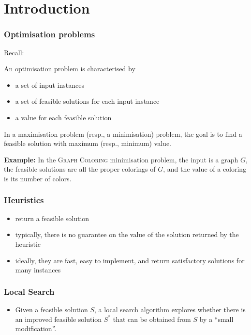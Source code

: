 



\section{Introduction}

\begin{frame}
	\frametitle{Optimisation problems}

  Recall:
  	\begin{definition}
  		An \alert{optimisation problem} is characterised by
  		\begin{itemize}
  			\item a set of input instances
  			\item a set of \alert{feasible solutions} for each input instance
  			\item a \alert{value} for each feasible solution
  		\end{itemize}
  		In a \alert{maximisation} problem (resp., a \alert{minimisation}) problem, the goal is to find a feasible solution with maximum (resp., minimum) value.
  	\end{definition}
  	
  	\noindent \textbf{Example:}
  	In the \textsc{Graph Coloring} minimisation problem, the input is a graph $G$, the feasible solutions are all the proper colorings of $G$, and the value of a coloring is its number of colors.

\end{frame}

\begin{frame}
	\frametitle{Heuristics}
	
	\begin{itemize}
		\item return a feasible solution
		\item typically, there is no guarantee on the value of the solution returned by the heuristic
		\item ideally, they are fast, easy to implement, and return satisfactory solutions for many instances
	\end{itemize}
\end{frame}

\begin{frame}
	\frametitle{Local Search}
	
	\begin{itemize}
		\item Given a feasible solution $S$, a local search algorithm explores whether there is an improved feasible solution $S^*$ that can be obtained from $S$ by a ``small modification''.
	\end{itemize}
\end{frame}


